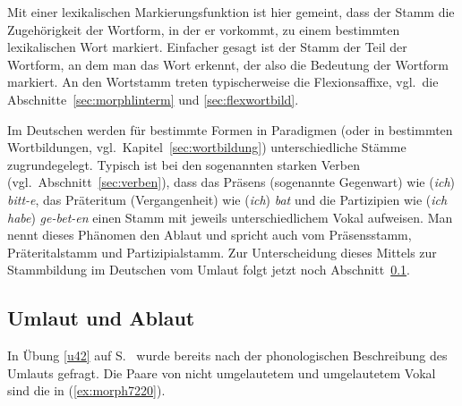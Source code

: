 

Mit einer lexikalischen Markierungsfunktion ist hier gemeint, dass der Stamm die Zugehörigkeit der Wortform, in der er vorkommt, zu einem bestimmten lexikalischen Wort markiert.
Einfacher gesagt ist der Stamm der Teil der Wortform, an dem man das Wort erkennt, der also die Bedeutung der Wortform markiert.
An den Wortstamm treten typischerweise die Flexionsaffixe, vgl.\ die Abschnitte~\ref{sec:morphlinterm} und \ref{sec:flexwortbild}.

Im Deutschen werden für bestimmte Formen in Paradigmen (oder in bestimmten Wortbildungen, vgl.\ Kapitel~\ref{sec:wortbildung}) unterschiedliche Stämme zugrundegelegt.
Typisch ist \zB bei den sogenannten starken Verben (vgl.\ Abschnitt~\ref{sec:verben}), dass das Präsens (sogenannte Gegenwart) wie (\textit{ich}) \textit{bitt-e}, das Präteritum (Vergangenheit) wie (\textit{ich}) \textit{bat} und die Partizipien wie (\textit{ich habe}) \textit{ge-bet-en} einen Stamm mit jeweils unterschiedlichem Vokal aufweisen.
Man nennt dieses Phänomen den Ablaut und spricht auch vom Präsensstamm, Präteritalstamm und Partizipialstamm.
Zur Unterscheidung dieses Mittels zur Stammbildung im Deutschen vom Umlaut folgt jetzt noch Abschnitt~\ref{sec:umablaut}.

\subsection{Umlaut und Ablaut}

\label{sec:umablaut}

In Übung \ref{u42} auf S.~\pageref{u42} wurde bereits nach der phonologischen Beschreibung des Umlauts gefragt.
Die Paare von nicht umgelautetem und umgelautetem Vokal sind die in (\ref{ex:morph7220}).

\begin{exe}
  \ex\label{ex:morph7220}
  \begin{xlist}
  \end{xlist}
\end{exe}


